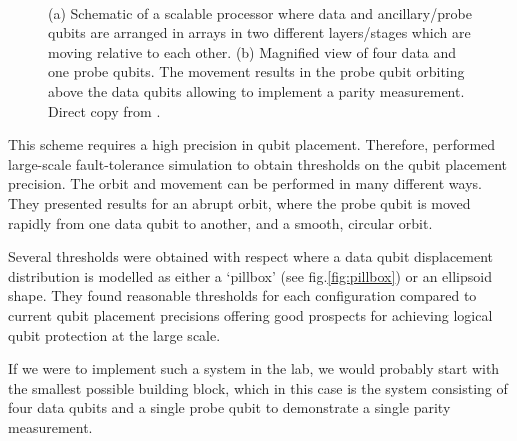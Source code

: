 \begin{figure}[H]
	\centering
	\\
	\caption[paper]{(a) Schematic of a scalable processor where data and ancillary/probe qubits are arranged in arrays in two different layers/stages which are moving relative to each other. (b) Magnified view of four data and one probe qubits. The movement results in the probe qubit orbiting above the data qubits allowing to implement a parity measurement. Direct copy from \cite{OGorman2016}.}
	\label{FIG:paper}
\end{figure}

This scheme requires a high precision in qubit placement. Therefore, \citet{OGorman2016} performed large-scale fault-tolerance simulation to obtain thresholds on the qubit placement precision. The orbit and movement can be performed in many different ways. They presented results for an abrupt orbit, where the probe qubit is moved rapidly from one data qubit to another, and a smooth, circular orbit.

Several thresholds were obtained with respect where a data qubit displacement distribution is modelled as either a `pillbox' (see fig.\@ \ref{fig:pillbox}) or an ellipsoid shape.
They found reasonable thresholds for each configuration compared to current qubit placement precisions offering good prospects for achieving logical qubit protection at the large scale. 

If we were to implement such a system in the lab, we would probably start with the smallest possible building block, which in this case is the system consisting of four data qubits and a single probe qubit to demonstrate a single parity measurement.
